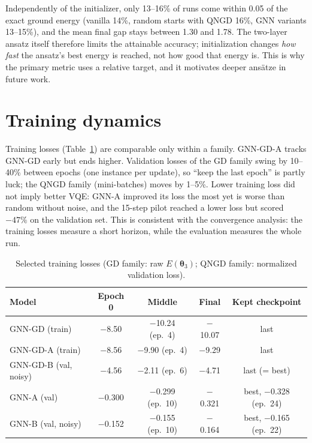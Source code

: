 \documentclass{ssnreview}
\begin{document}
Independently of the initializer, only 13--16\% of runs come within 0.05 of the exact ground
energy (vanilla 14\%, random starts with QNGD 16\%, GNN variants 13--15\%), and the mean final
gap stays between 1.30 and 1.78. The two-layer ansatz itself therefore limits the attainable
accuracy; initialization changes \emph{how fast} the ansatz's best energy is reached, not how
good that energy is. This is why the primary metric uses a relative target, and it motivates
deeper ansätze in future work.

\section{Training dynamics}

Training losses (Table~\ref{tab:train}) are comparable only within a family. GNN-GD-A tracks
GNN-GD early but ends higher. Validation losses of the GD family swing by 10--40\% between
epochs (one instance per update), so ``keep the last epoch'' is partly luck; the QNGD family
(mini-batches) moves by 1--5\%. Lower training loss did not imply better VQE: GNN-A improved its
loss the most yet is worse than random without noise, and the 15-step pilot reached a lower loss
but scored $-47\%$ on the validation set. This is consistent with the convergence analysis: the
training losses measure a short horizon, while the evaluation measures the whole run.

\begin{table}[H]
\centering
\caption{Selected training losses (GD family: raw $E(\boldsymbol\theta_3)$; QNGD family:
normalized validation loss).}\label{tab:train}
\begin{tabular}{lcccc}
\toprule
Model & Epoch 0 & Middle & Final & Kept checkpoint \\
\midrule
GNN-GD (train)    & $-$8.50 & $-$10.24 (ep.\ 4) & $-$10.07 & last \\
GNN-GD-A (train)  & $-$8.56 & $-$9.90 (ep.\ 4)  & $-$9.29  & last \\
GNN-GD-B (val, noisy) & $-$4.56 & $-$2.11 (ep.\ 6) & $-$4.71 & last (= best) \\
GNN-A (val)       & $-$0.300 & $-$0.299 (ep.\ 10) & $-$0.321 & best, $-$0.328 (ep.\ 24) \\
GNN-B (val, noisy) & $-$0.152 & $-$0.155 (ep.\ 10) & $-$0.164 & best, $-$0.165 (ep.\ 22) \\
\bottomrule
\end{tabular}
\end{table}
\end{document}
